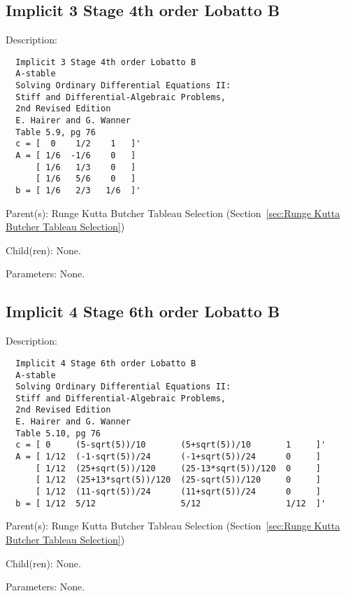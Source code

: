 \subsection{Implicit 3 Stage 4th order Lobatto B}
\label{sec:Implicit 3 Stage 4th order Lobatto B}

\begin{list}{}
  {\setlength{\leftmargin}{1.0in}
   \setlength{\labelwidth}{0.75in}
   \setlength{\labelsep}{0.125in}}
  \item[Description:]
\begin{verbatim}
  Implicit 3 Stage 4th order Lobatto B
  A-stable
  Solving Ordinary Differential Equations II:
  Stiff and Differential-Algebraic Problems,
  2nd Revised Edition
  E. Hairer and G. Wanner
  Table 5.9, pg 76
  c = [  0    1/2    1   ]'
  A = [ 1/6  -1/6    0   ]
      [ 1/6   1/3    0   ]
      [ 1/6   5/6    0   ]
  b = [ 1/6   2/3   1/6  ]'
\end{verbatim}
  \item[Parent(s):]
    Runge Kutta Butcher Tableau Selection (Section~\ref{sec:Runge Kutta Butcher Tableau Selection})
  \item[Child(ren):]
    None. 
  \item[Parameters:]
    None. 
\end{list}

\subsection{Implicit 4 Stage 6th order Lobatto B}
\label{sec:Implicit 4 Stage 6th order Lobatto B}

\begin{list}{}
  {\setlength{\leftmargin}{1.0in}
   \setlength{\labelwidth}{0.75in}
   \setlength{\labelsep}{0.125in}}
  \item[Description:]
\begin{verbatim}
  Implicit 4 Stage 6th order Lobatto B
  A-stable
  Solving Ordinary Differential Equations II:
  Stiff and Differential-Algebraic Problems,
  2nd Revised Edition
  E. Hairer and G. Wanner
  Table 5.10, pg 76
  c = [ 0     (5-sqrt(5))/10       (5+sqrt(5))/10       1     ]'
  A = [ 1/12  (-1-sqrt(5))/24      (-1+sqrt(5))/24      0     ]
      [ 1/12  (25+sqrt(5))/120     (25-13*sqrt(5))/120  0     ]
      [ 1/12  (25+13*sqrt(5))/120  (25-sqrt(5))/120     0     ]
      [ 1/12  (11-sqrt(5))/24      (11+sqrt(5))/24      0     ]
  b = [ 1/12  5/12                 5/12                 1/12  ]'
\end{verbatim}
  \item[Parent(s):]
    Runge Kutta Butcher Tableau Selection (Section~\ref{sec:Runge Kutta Butcher Tableau Selection})
  \item[Child(ren):]
    None. 
  \item[Parameters:]
    None. 
\end{list}

